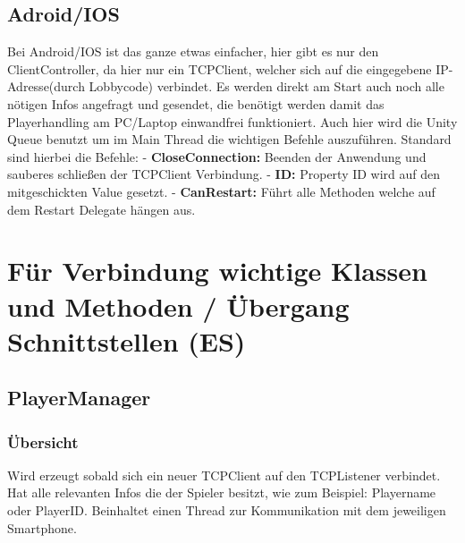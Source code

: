 \subsection{Adroid/IOS}
Bei Android/IOS ist das ganze etwas einfacher, hier gibt es nur den ClientController, da hier nur ein TCPClient, welcher sich auf die eingegebene IP-Adresse(durch Lobbycode) verbindet. Es werden direkt am Start auch noch alle nötigen Infos angefragt und gesendet, die benötigt werden damit das Playerhandling am PC/Laptop einwandfrei funktioniert. Auch hier wird die Unity Queue benutzt um im Main Thread die wichtigen Befehle auszuführen. Standard sind hierbei die Befehle:
\newline \tab
- \textbf{CloseConnection:} Beenden der Anwendung und sauberes schließen der \newline \tab TCPClient Verbindung.
\newline \tab
- \textbf{ID:} Property ID wird auf den mitgeschickten Value gesetzt.
\newline \tab 
- \textbf{CanRestart:} Führt alle Methoden welche auf dem Restart Delegate hängen aus.
\section{Für Verbindung wichtige Klassen und Methoden / Übergang Schnittstellen (ES)} 
\subsection{PlayerManager}
\subsubsection{Übersicht}
Wird erzeugt sobald sich ein neuer TCPClient auf den TCPListener verbindet. Hat alle relevanten Infos die der Spieler besitzt, wie zum Beispiel: Playername oder PlayerID. Beinhaltet einen Thread zur Kommunikation mit dem jeweiligen Smartphone.
